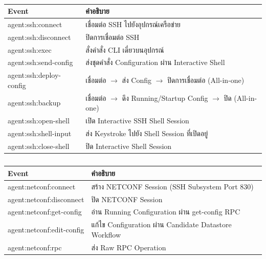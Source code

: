 \begin{table}[H]
\centering
\caption{}
\label{tabD2:AgentCommands}
\fontSixTeen
\begin{tabularx}{\textwidth}{|l|X|}
\hline
\textbf{Event} & \textbf{คำอธิบาย} \\
\hline
agent:ssh:connect & เชื่อมต่อ SSH ไปยังอุปกรณ์เครือข่าย \\
\hline
agent:ssh:disconnect & ปิดการเชื่อมต่อ SSH \\
\hline
agent:ssh:exec & สั่งคำสั่ง CLI เดี่ยวบนอุปกรณ์ \\
\hline
agent:ssh:send-config & ส่งชุดคำสั่ง Configuration ผ่าน Interactive Shell \\
\hline
agent:ssh:deploy-config & เชื่อมต่อ $\rightarrow$ ส่ง Config $\rightarrow$ ปิดการเชื่อมต่อ (All-in-one) \\
\hline
agent:ssh:backup & เชื่อมต่อ $\rightarrow$ ดึง Running/Startup Config $\rightarrow$ ปิด (All-in-one) \\
\hline
agent:ssh:open-shell & เปิด Interactive SSH Shell Session \\
\hline
agent:ssh:shell-input & ส่ง Keystroke ไปยัง Shell Session ที่เปิดอยู่ \\
\hline
agent:ssh:close-shell & ปิด Interactive Shell Session \\
\hline
\end{tabularx}
\end{table}

\begin{table}[H]
\centering
\caption{}
\label{tabD2:NetconfCommands}
\fontSixTeen
\begin{tabularx}{\textwidth}{|l|X|}
\hline
\textbf{Event} & \textbf{คำอธิบาย} \\
\hline
agent:netconf:connect & สร้าง NETCONF Session (SSH Subsystem Port 830) \\
\hline
agent:netconf:disconnect & ปิด NETCONF Session \\
\hline
agent:netconf:get-config & อ่าน Running Configuration ผ่าน get-config RPC \\
\hline
agent:netconf:edit-config & แก้ไข Configuration ผ่าน Candidate Datastore Workflow \\
\hline
agent:netconf:rpc & ส่ง Raw RPC Operation \\
\hline
\end{tabularx}
\end{table}

